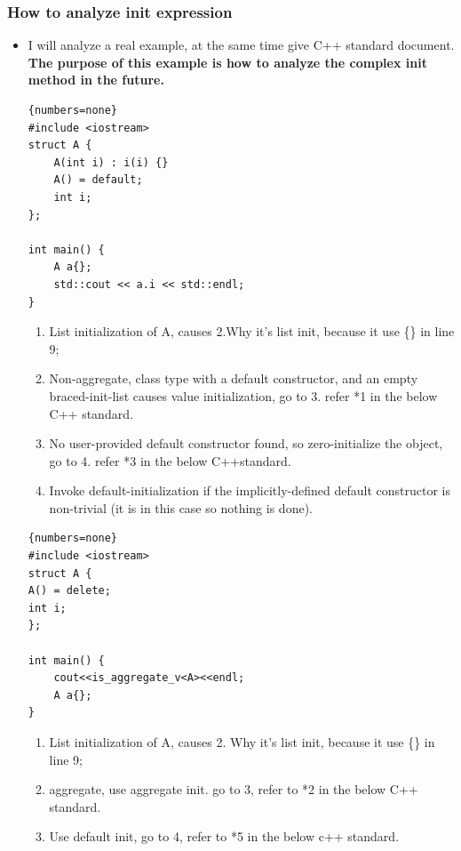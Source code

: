 \documentclass[a4paper,11pt,twoside]{book}
\begin{document}
\subsubsection{How to analyze init expression}
\begin{itemize}
	\item I will analyze a real example, at the same time give C++ standard document. \textbf{The purpose of this example is how to analyze the complex init method in the future.}
\begin{lstlisting}{numbers=none}
#include <iostream>
struct A {
	A(int i) : i(i) {}
	A() = default;
	int i;
};
	
int main() {
	A a{};
	std::cout << a.i << std::endl;
}
\end{lstlisting}

	\begin{enumerate}
		\item List initialization of A, causes 2.Why it's list init, because it use \{\} in line 9;
		
		\item Non-aggregate, class type with a default constructor, and an empty braced-init-list causes value initialization, go to 3. refer *1 in the below C++ standard.
		
		\item No user-provided default constructor found, so zero-initialize the object, go to 4. refer *3 in the below C++standard.
		
		\item Invoke default-initialization if the implicitly-defined default constructor is non-trivial (it is in this case so nothing is done).
	\end{enumerate}


\begin{lstlisting}{numbers=none}
#include <iostream>
struct A {
A() = delete;
int i;
};

int main() {
	cout<<is_aggregate_v<A><<endl;
	A a{};
}
\end{lstlisting}

\begin{enumerate}
	\item List initialization of A, causes 2. Why it's list init, because it use \{\} in line 9;
	
	\item aggregate,  use aggregate init. go to 3, refer to *2 in the below C++ standard.
	
	\item Use default init, go to 4, refer to *5 in the below c++ standard.
	

\end{enumerate}
\end{itemize}
\end{document}
